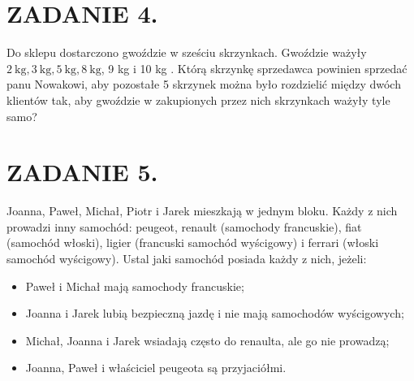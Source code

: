 \documentclass[10pt]{article}
\begin{document}
\section*{ZADANIE 4.}
Do sklepu dostarczono gwoździe w sześciu skrzynkach. Gwoździe ważyły \(2 \mathrm{~kg}, 3 \mathrm{~kg}, 5 \mathrm{~kg}, 8 \mathrm{~kg}\), 9 kg i 10 kg . Którą skrzynkę sprzedawca powinien sprzedać panu Nowakowi, aby pozostałe 5 skrzynek można było rozdzielić między dwóch klientów tak, aby gwoździe w zakupionych przez nich skrzynkach ważyły tyle samo?

\section*{ZADANIE 5.}
Joanna, Paweł, Michał, Piotr i Jarek mieszkają w jednym bloku. Każdy z nich prowadzi inny samochód: peugeot, renault (samochody francuskie), fiat (samochód włoski), ligier (francuski samochód wyścigowy) i ferrari (włoski samochód wyścigowy). Ustal jaki samochód posiada każdy z nich, jeżeli:

\begin{itemize}
  \item Paweł i Michał mają samochody francuskie;
  \item Joanna i Jarek lubią bezpieczną jazdę i nie mają samochodów wyścigowych;
  \item Michał, Joanna i Jarek wsiadają często do renaulta, ale go nie prowadzą;
  \item Joanna, Paweł i właściciel peugeota są przyjaciółmi.
\end{itemize}
\end{document}
